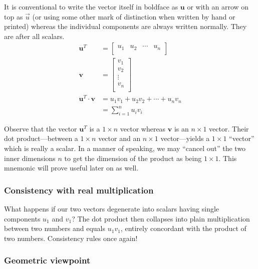 \documentclass[
  a4paper,
]{article}
\begin{document}
It is conventional to write the vector itself in boldface as
\(\mathbf{u}\) or with an arrow on top as \(\vec{u}\) (or using some
other mark of distinction when written by hand or printed) whereas the
individual components are always written normally. They are after all
scalars. \[
\begin{aligned}
\mathbf{u}^{T} &= \begin{bmatrix}u_{1} & u_{2} &  \cdots & u_{n}\\\end{bmatrix}\\
\mathbf{v} &= \begin{bmatrix}v_{1} \\ v_{2} \\ \vdots \\ v_{n}\\\end{bmatrix}\\
\mathbf{u}^{T}\cdot\mathbf{v} &= u_{1}v_{1} + u_{2}v_{2} + \cdots + u_{n}v_{n}\\
&= \sum_{i=1}^{n} u_{i}v_{i}
\end{aligned}
\]

Observe that the vector \(\mathbf{u}^{T}\) is a \(1 \times n\) vector
whereas \(\mathbf{v}\) is an \(n \times 1\) vector. Their dot
product---between a \(1 \times n\) vector and an \(n \times 1\)
vector---yields a \(1 \times 1\) ``vector'' which is really a scalar. In
a manner of speaking, we may ``cancel out'' the two inner dimensions
\(n\) to get the dimension of the product as being \(1 \times 1\). This
mnemonic will prove useful later on as well.

\hypertarget{consistency-with-real-multiplication}{%
\subsubsection{Consistency with real
multiplication}\label{consistency-with-real-multiplication}}

What happens if our two vectors degenerate into scalars having single
components \(u_{1}\) and \(v_{1}\)? The dot product then collapses into
plain multiplication between two numbers and equals \(u_{1}v_{1}\),
entirely concordant with the product of two numbers. Consistency rules
once again!

\hypertarget{geometric-viewpoint}{%
\subsubsection{Geometric viewpoint}\label{geometric-viewpoint}}
\end{document}
